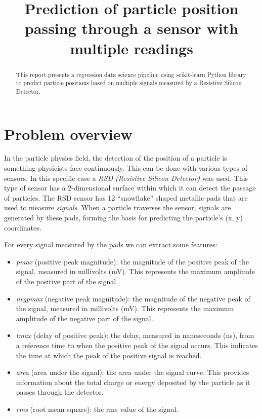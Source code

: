 \documentclass[conference]{IEEEtran}
\begin{document}
\title{Prediction of particle position passing through a sensor with multiple readings}

\author{
}

\maketitle

\begin{abstract}
This report presents a regression data science pipeline using scikit-learn Python library to 
predict particle positions based on multiple signals measured by a Resistive Silicon Detector.
\end{abstract}


\section{Problem overview}
In the particle physics field, the detection of the position of a particle is something physicists face continuously. 
This can be done with various types of sensors. In this specific case a \textit{RSD (Resistive Silicon Detector)} 
was used. This type of sensor has a 2-dimensional surface within which it can detect the passage of particles.
The RSD sensor has 12 “snowflake” shaped metallic pads that are used to measure \textit{signals}. 
When a particle traverses the sensor, signals are generated by these pads, forming the basis for predicting 
the particle's (x, y) coordinates.

For every signal measured by the pads we can extract some features:
\begin{itemize}
    \item \textit{pmax} (positive peak magnitude): the magnitude of the positive peak of the signal, 
    measured in millivolts (mV). 
    This represents the maximum amplitude of the positive part of the signal.
    \item \textit{negpmax} (negative peak magnitude): the magnitude of the negative peak of the signal, 
    measured in millivolts (mV). 
    This represents the maximum amplitude of the negative part of the signal.
    \item \textit{tmax} (delay of positive peak): the delay, measured in nanoseconds (ns), 
    from a reference time to when the positive peak of the signal occurs. 
    This indicates the time at which the peak of the positive signal is reached.
    \item \textit{area} (area under the signal): the area under the signal curve.
    This provides information about the total charge or energy deposited by the 
    particle as it passes through the detector.
    \item \textit{rms} (root mean square): the rms value of the signal.
\end{itemize}
\end{document}
